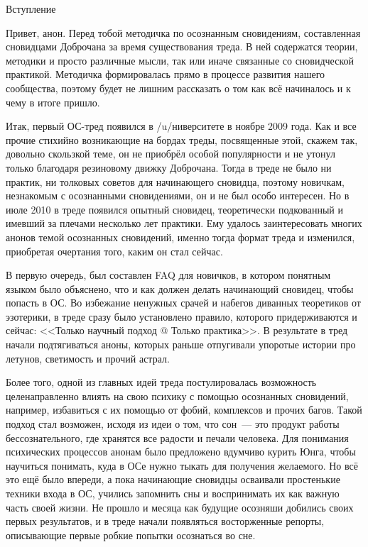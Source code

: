\documentclass[a4paper,14pt,oneside]{memoir}
\begin{document}


\thispagestyle{empty}

{\large\textsf{Вступление}}

\bigskip

\setcounter{page}{2}
Привет, анон. Перед тобой методичка по осознанным сновидениям, составленная сновидцами Доброчана за время существования треда. В ней содержатся теории, методики и просто различные мысли, так или иначе связанные со сновидческой практикой. Методичка формировалась прямо в процессе развития нашего сообщества, поэтому будет не лишним рассказать о том как всё начиналось и к чему в итоге пришло.

Итак, первый ОС-тред появился в /u/ниверситете в ноябре 2009 года. Как и все прочие стихийно возникающие на бордах треды, посвященные этой, скажем так, довольно скользкой теме, он не приобрёл особой популярности и не утонул только благодаря резиновому движку Доброчана. Тогда в треде не было ни практик, ни толковых советов для начинающего сновидца, поэтому новичкам, незнакомым с осознанными сновидениями, он и не был особо интересен. Но в июле 2010 в треде появился опытный сновидец,  теоретически подкованный и имевший за плечами несколько лет практики.  Ему удалось заинтересовать многих анонов темой осознанных сновидений, именно тогда формат треда и изменился, приобретая очертания того, каким он стал сейчас.



В первую очередь, был составлен FAQ для новичков, в котором понятным языком было объяснено, что и как должен делать начинающий сновидец, чтобы попасть в ОС. Во избежание ненужных срачей и набегов диванных теоретиков от эзотерики, в треде сразу было установлено правило, которого придерживаются и сейчас: <<Только научный подход @ Только практика>>. В результате в тред начали подтягиваться аноны, которых раньше отпугивали упоротые истории про летунов, светимость и прочий астрал. 

\thispagestyle{empty}

Более того, одной из главных идей треда постулировалась возможность целенаправленно влиять на свою психику с помощью осознанных сновидений, например, избавиться с их помощью от фобий, комплексов и прочих багов. Такой подход стал возможен, исходя из идеи о том, что сон~--- это продукт работы бессознательного, где хранятся все радости и печали человека. Для понимания психических процессов анонам было предложено вдумчиво курить Юнга, чтобы научиться понимать, куда в ОСе нужно тыкать для получения желаемого. Но всё это ещё было впереди, а пока начинающие сновидцы осваивали простенькие техники входа в ОС, учились запомнить сны и воспринимать их как важную часть своей жизни. Не прошло и месяца как будущие осозняши добились своих первых результатов,  и в треде начали появляться восторженные репорты, описывающие первые робкие попытки осознаться во сне.
\end{document}
